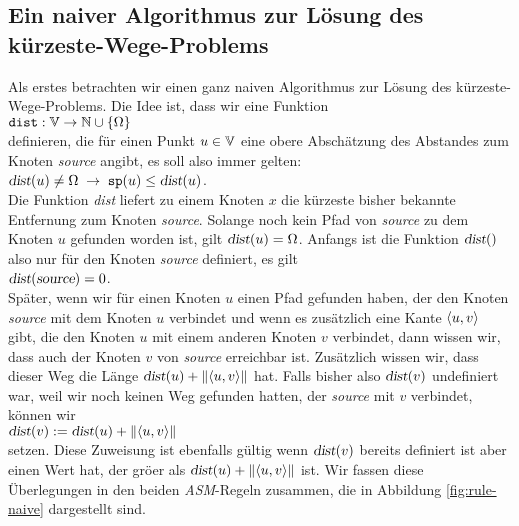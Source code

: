\subsection{Ein naiver Algorithmus zur L\"osung des k\"urzeste-Wege-Problems}
Als erstes betrachten wir einen ganz naiven Algorithmus zur L\"osung des k\"urzeste-Wege-Problems.
Die Idee ist, dass wir eine Funktion \\[0.2cm]
\hspace*{1.3cm} $\texttt{dist}: {\mathbb V} \rightarrow {\mathbb N} \cup \{\Omega\}$ \\[0.2cm]
definieren, die f\"ur einen Punkt $u \in {\mathbb V}$ eine obere Absch\"atzung des Abstandes zum Knoten
\textsl{source} angibt, es soll also immer gelten: \\[0.2cm]
\hspace*{1.3cm} $\textsl{dist}(u) \not= \Omega \;\rightarrow\; \mbox{\tt sp}(u) \leq
\textsl{dist}(u)$. \\[0.2cm]
Die Funktion \textsl{dist} liefert zu einem Knoten $x$ die k\"urzeste bisher
bekannte Entfernung zum Knoten \textsl{source}.  Solange noch kein Pfad von
\textsl{source} zu dem Knoten $u$ gefunden worden ist, gilt $\textsl{dist}(u) = \Omega$.
Anfangs ist die Funktion $\textsl{dist}()$ also nur f\"ur den Knoten \textsl{source}
definiert, es gilt \\[0.2cm]
\hspace*{1.3cm} $\textsl{dist}(\textsl{source}) = 0$. \\[0.2cm]
Sp\"ater, wenn wir f\"ur einen Knoten $u$ einen Pfad gefunden haben, der den Knoten
\textsl{source} mit dem Knoten $u$ verbindet und wenn es zus\"atzlich eine Kante
$\pair(u,v)$ gibt, die den Knoten $u$ mit einem anderen Knoten $v$ verbindet, dann wissen
wir, dass auch der Knoten $v$ von \textsl{source} erreichbar ist.  Zus\"atzlich wissen wir,
dass dieser Weg die L\"ange $\textsl{dist}(u) + \weight{\pair(u,v)}$ hat.  Falls bisher also
$\textsl{dist}(v)$ undefiniert war, weil wir noch keinen Weg gefunden hatten, der
\textsl{source} mit $v$ verbindet, k\"onnen wir \\
\hspace*{1.3cm} $\textsl{dist}(v) := \textsl{dist}(u) + \weight{\pair(u,v)}$ \\[0.2cm]
setzen.  Diese Zuweisung ist ebenfalls g\"ultig wenn $\textsl{dist}(v)$ bereits definiert
ist aber einen Wert hat, der gr\"o\3er als $\textsl{dist}(u) + \weight{\pair(u,v)}$ ist.
Wir fassen diese \"Uberlegungen in den beiden
\textsl{ASM}-Regeln zusammen, die in Abbildung \ref{fig:rule-naive} dargestellt sind.  
